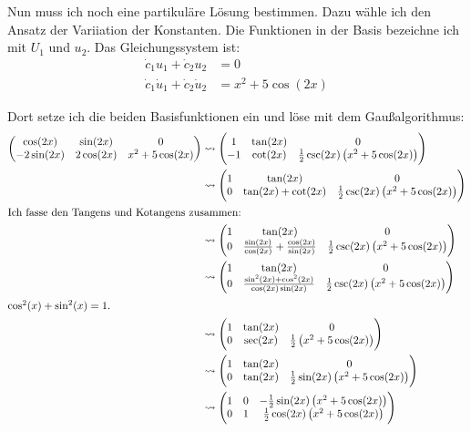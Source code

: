 \documentclass[11pt, ngerman]{article}
\begin{document}
Nun muss ich noch eine partikuläre Lösung bestimmen. Dazu wähle ich den Ansatz
der Variiation der Konstanten. Die Funktionen in der Basis bezeichne ich mit
$U_1$ und $u_2$. Das Gleichungssystem ist:
\begin{align*}
	\dot c_1 u_1 + \dot c_2 u_2 &= 0 \\
	\dot c_1 \dot u_1 + \dot c_2 \dot u_2 &= x^2 + 5 \cos(2x)
\end{align*}

Dort setze ich die beiden Basisfunktionen ein und löse mit dem Gaußalgorithmus:
\begin{align*}
	\begin{pmatrix}
		\cos(2x) & \sin(2x) & 0 \\
		- 2 \sin(2x) & 2 \cos(2x) & x^2 + 5 \cos(2x)
	\end{pmatrix}
	&\leadsto
	\begin{pmatrix}
		1 & \tan(2x) & 0 \\
		-1 & \cot(2x) & \frac 12 \csc(2x) \del{x^2 + 5 \cos(2x)}
	\end{pmatrix} \\
	&\leadsto
	\begin{pmatrix}
		1 & \tan(2x) & 0 \\
		0 & \tan(2x) + \cot(2x) & \frac 12 \csc(2x) \del{x^2 + 5 \cos(2x)}
	\end{pmatrix} \\
	\intertext{Ich fasse den Tangens und Kotangens zusammen:}
	&\leadsto
	\begin{pmatrix}
		1 & \tan(2x) & 0 \\
		0 & \frac{\sin(2x)}{\cos(2x)} + \frac{\cos(2x)}{\sin(2x)} & \frac 12 \csc(2x) \del{x^2 + 5 \cos(2x)}
	\end{pmatrix} \\
	&\leadsto
	\begin{pmatrix}
		1 & \tan(2x) & 0 \\
		0 & \frac{\sin^2(2x) + \cos^2(2x)}{\cos(2x)\sin(2x)} & \frac 12 \csc(2x) \del{x^2 + 5 \cos(2x)}
	\end{pmatrix} \\
	\intertext{$\cos^2(x) + \sin^2(x) = 1$.}
	&\leadsto
	\begin{pmatrix}
		1 & \tan(2x) & 0 \\
		0 & \sec(2x) & \frac 12 \del{x^2 + 5 \cos(2x)}
	\end{pmatrix} \\
	&\leadsto
	\begin{pmatrix}
		1 & \tan(2x) & 0 \\
		0 & \tan(2x) & \frac 12 \sin(2x) \del{x^2 + 5 \cos(2x)}
	\end{pmatrix} \\
	&\leadsto
	\begin{pmatrix}
		1 & 0 & -\frac 12 \sin(2x) \del{x^2 + 5 \cos(2x)} \\
		0 & 1 & \frac 12 \cos(2x) \del{x^2 + 5 \cos(2x)}
	\end{pmatrix}
\end{align*}
\end{document}
